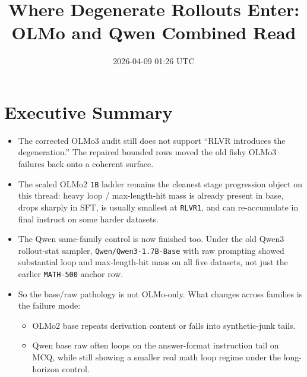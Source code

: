 \documentclass[11pt]{article}
\title{Where Degenerate Rollouts Enter: OLMo and Qwen Combined Read}
\author{}
\date{2026-04-09 01:26 UTC}
\begin{document}
\maketitle

\section*{Executive Summary}
\begin{itemize}[leftmargin=1.5em]
\item The corrected OLMo3 audit still does not support ``RLVR introduces the degeneration.'' The repaired bounded rows moved the old fishy OLMo3 failures back onto a coherent surface.
\item The scaled OLMo2 \texttt{1B} ladder remains the cleanest stage progression object on this thread: heavy loop / max-length-hit mass is already present in base, drops sharply in SFT, is usually smallest at \texttt{RLVR1}, and can re-accumulate in final instruct on some harder datasets.
\item The Qwen same-family control is now finished too. Under the old Qwen3 rollout-stat sampler, \texttt{Qwen/Qwen3-1.7B-Base} with raw prompting showed substantial loop and max-length-hit mass on all five datasets, not just the earlier \texttt{MATH-500} anchor row.
\item So the base/raw pathology is not OLMo-only. What changes across families is the failure mode:
\begin{itemize}[leftmargin=1.5em]
\item OLMo2 base repeats derivation content or falls into synthetic-junk tails.
\item Qwen base raw often loops on the answer-format instruction tail on MCQ, while still showing a smaller real math loop regime under the long-horizon control.
\end{itemize}
\end{itemize}
\end{document}
